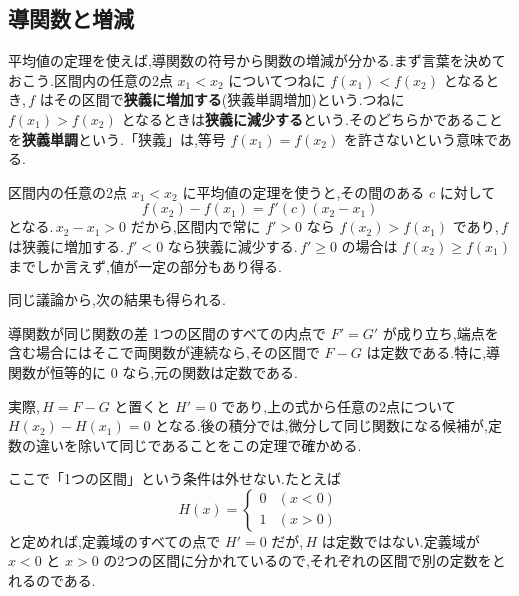 \subsection{導関数と増減}
平均値の定理を使えば,導関数の符号から関数の増減が分かる.まず言葉を決めておこう.区間内の任意の2点 $x_1<x_2$ についてつねに $f(x_1)<f(x_2)$ となるとき,\,$f$ はその区間で\textbf{狭義に増加する}(狭義単調増加)という.つねに $f(x_1)>f(x_2)$ となるときは\textbf{狭義に減少する}という.そのどちらかであることを\textbf{狭義単調}という.\label{用語:狭義単調}「狭義」は,等号 $f(x_1)=f(x_2)$ を許さないという意味である.

区間内の任意の2点 $x_1<x_2$ に平均値の定理を使うと,その間のある $c$ に対して
\[
 f(x_2)-f(x_1)=f'(c)(x_2-x_1)
\]
となる.\,$x_2-x_1>0$ だから,区間内で常に $f'>0$ なら $f(x_2)>f(x_1)$ であり,\,$f$ は狭義に増加する.\,$f'<0$ なら狭義に減少する.\,$f'\ge0$ の場合は $f(x_2)\ge f(x_1)$ までしか言えず,値が一定の部分もあり得る.

同じ議論から,次の結果も得られる.
\begin{theorem}{導関数が同じ関数の差}\label{定理:導関数同じ}
1つの区間のすべての内点で $F'=G'$ が成り立ち,端点を含む場合にはそこで両関数が連続なら,その区間で $F-G$ は定数である.特に,導関数が恒等的に $0$ なら,元の関数は定数である.
\end{theorem}

実際,\,$H=F-G$ と置くと $H'=0$ であり,上の式から任意の2点について $H(x_2)-H(x_1)=0$ となる.後の積分では,微分して同じ関数になる候補が,定数の違いを除いて同じであることをこの定理で確かめる.

ここで「1つの区間」という条件は外せない.たとえば
\[
 H(x)=
 \begin{cases}
  0 & (x<0)\\
  1 & (x>0)
 \end{cases}
\]
と定めれば,定義域のすべての点で $H'=0$ だが,\,$H$ は定数ではない.定義域が $x<0$ と $x>0$ の2つの区間に分かれているので,それぞれの区間で別の定数をとれるのである.
